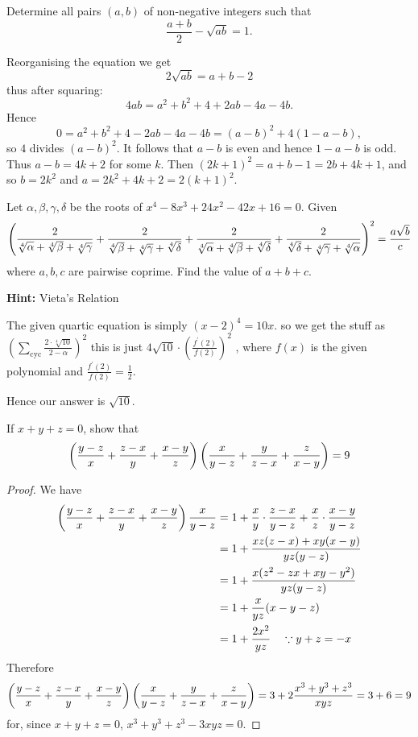 \begin{prbm}
Determine all pairs $(a,b)$ of non-negative integers such that
\[ \frac{a+b}{2}-\sqrt{ab}=1. \]
\end{prbm}

\begin{solution}
Reorganising the equation we get 
\[ 2\sqrt{ab}=a+b-2 \]
thus after squaring:
\[ 4ab=a^2+b^2+4+2ab-4a-4b. \]
Hence 
\[ 0=a^2+b^2+4-2ab-4a-4b=(a-b)^2+4(1-a-b), \]
so $4$ divides $(a-b)^2$. It follows that $a-b$ is even and hence $1-a-b$ is odd. Thus $a-b=4k+2$ for some $k$. Then $(2k+1)^2=a+b-1=2b+4k+1$, and so $b=2k^2$ and $a=2k^2+4k+2=2(k+1)^2$.
\end{solution}
\pagebreak

\begin{prbm}
Let $\alpha,\beta,\gamma,\delta$ be the roots of $x^4-8x^3+24x^2-42x+16=0$. Given
\[ \left(\frac{2}{\sqrt[4]{\alpha}+\sqrt[4]{\beta}+\sqrt[4]{\gamma}}+\frac{2}{\sqrt[4]{\beta}+\sqrt[4]{\gamma}+\sqrt[4]{\delta}}+\frac{2}{\sqrt[4]{\alpha}+\sqrt[4]{\beta}+\sqrt[4]{\delta}}+\frac{2}{\sqrt[4]{\delta}+\sqrt[4]{\gamma}+\sqrt[4]{\alpha}}\right)^2=\frac{a\sqrt{b}}{c} \]
where $a,b,c$ are pairwise coprime. Find the value of $a+b+c$.

\textbf{Hint:} Vieta's Relation
\end{prbm}
\begin{solution}
The given quartic equation is simply $(x-2)^4=10x$. so we get the stuff as $\left(\sum_{\mathrm{cyc}} \frac{2\cdot \sqrt[4]{10}}{2-\alpha}\right)^2$ this is just $4\sqrt{10} \cdot \left(\frac{f^\prime(2)}{f(2)}\right)^2$ , where $f(x)$ is the given polynomial and $\frac{f^\prime(2)}{f(2)}=\frac{1}{2}$. 

Hence our answer is $\boxed{\sqrt{10}}$.
\end{solution}
\pagebreak

\begin{prbm}
If $x+y+z=0$, show that 
\[ \left(\frac{y-z}{x}+\frac{z-x}{y}+\frac{x-y}{z}\right) \left(\frac{x}{y-z}+\frac{y}{z-x}+\frac{z}{x-y}\right)=9 \]
\end{prbm}

\begin{proof}
We have 
\begin{align*}
\left(\frac{y-z}{x}+\frac{z-x}{y}+\frac{x-y}{z}\right)\frac{x}{y-z}
&= 1+\frac{x}{y}\cdot\frac{z-x}{y-z}+\frac{x}{z}\cdot\frac{x-y}{y-z} \\
&= 1+\frac{xz(z-x)+xy(x-y)}{yz(y-z)} \\
&= 1+\frac{x(z^2-zx+xy-y^2)}{yz(y-z)} \\
&= 1+\frac{x}{yz}(x-y-z) \\
&= 1+\frac{2x^2}{yz} \quad \because y+z=-x
\end{align*}
Therefore
\[ \left(\frac{y-z}{x}+\frac{z-x}{y}+\frac{x-y}{z}\right) \left(\frac{x}{y-z}+\frac{y}{z-x}+\frac{z}{x-y}\right)=3+2\frac{x^3+y^3+z^3}{xyz}=3+6=9 \]
for, since $x+y+z=0$, $x^3+y^3+z^3-3xyz=0$.
\end{proof}
\pagebreak

